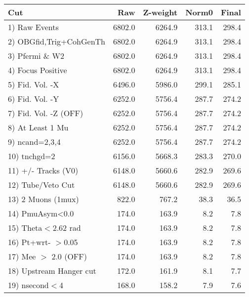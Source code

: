  \begin{table}[h!]\centering
 \begin{tabular}{||l||r|r|r|r||}
 \hline
 \hline
 Cut & Raw & Z-weight & Norm0 & Final \\
 \hline
  1) Raw Events           &      6802.0 &      6264.9 &       313.1 &       298.4 \\
  2) OBGfid,Trig+CohGenTh &      6802.0 &      6264.9 &       313.1 &       298.4 \\
  3) Pfermi \& W2         &      6802.0 &      6264.9 &       313.1 &       298.4 \\
  4) Focus Positive       &      6802.0 &      6264.9 &       313.1 &       298.4 \\
  5) Fid. Vol. -X         &      6496.0 &      5986.0 &       299.1 &       285.1 \\
  6) Fid. Vol. -Y         &      6252.0 &      5756.4 &       287.7 &       274.2 \\
  7) Fid. Vol. -Z (OFF)   &      6252.0 &      5756.4 &       287.7 &       274.2 \\
  8) At Least 1 Mu        &      6252.0 &      5756.4 &       287.7 &       274.2 \\
  9) ncand=2,3,4          &      6252.0 &      5756.4 &       287.7 &       274.2 \\
 10) tnchgd=2             &      6156.0 &      5668.3 &       283.3 &       270.0 \\
 11) +/- Tracks (V0)      &      6148.0 &      5660.6 &       282.9 &       269.6 \\
 12) Tube/Veto Cut        &      6148.0 &      5660.6 &       282.9 &       269.6 \\
 13) 2 Muons (1mux)       &       822.0 &       767.2 &        38.3 &        36.5 \\
 14) PmuAsym<0.0          &       174.0 &       163.9 &         8.2 &         7.8 \\
 15) Theta$<$2.62 rad     &       174.0 &       163.9 &         8.2 &         7.8 \\
 16) Pt+wrt- $>$0.05      &       174.0 &       163.9 &         8.2 &         7.8 \\
 17) Mee $>$ 2.0  (OFF)   &       174.0 &       163.9 &         8.2 &         7.8 \\
 18) Upstream Hanger cut  &       172.0 &       161.9 &         8.1 &         7.7 \\
 19) nsecond$<$4          &       168.0 &       158.2 &         7.9 &         7.6 \\

\end{tabular}
\end{table}
